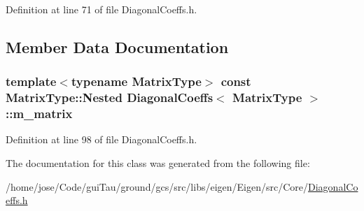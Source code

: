 Definition at line 71 of file Diagonal\-Coeffs.\-h.



\subsection{Member Data Documentation}
\hypertarget{class_diagonal_coeffs_ad63500614069b5e66525a62b66b8ae7b}{
\subsubsection[{m\-\_\-matrix}]{\setlength{\rightskip}{0pt plus 5cm}template$<$typename Matrix\-Type$>$ const Matrix\-Type\-::\-Nested {\bf Diagonal\-Coeffs}$<$ Matrix\-Type $>$\-::m\-\_\-matrix\hspace{0.3cm}{\ttfamily [protected]}}}\label{class_diagonal_coeffs_ad63500614069b5e66525a62b66b8ae7b}


Definition at line 98 of file Diagonal\-Coeffs.\-h.



The documentation for this class was generated from the following file\-:\begin{DoxyCompactItemize}
\item 
/home/jose/\-Code/gui\-Tau/ground/gcs/src/libs/eigen/\-Eigen/src/\-Core/\hyperlink{_diagonal_coeffs_8h}{Diagonal\-Coeffs.\-h}\end{DoxyCompactItemize}
